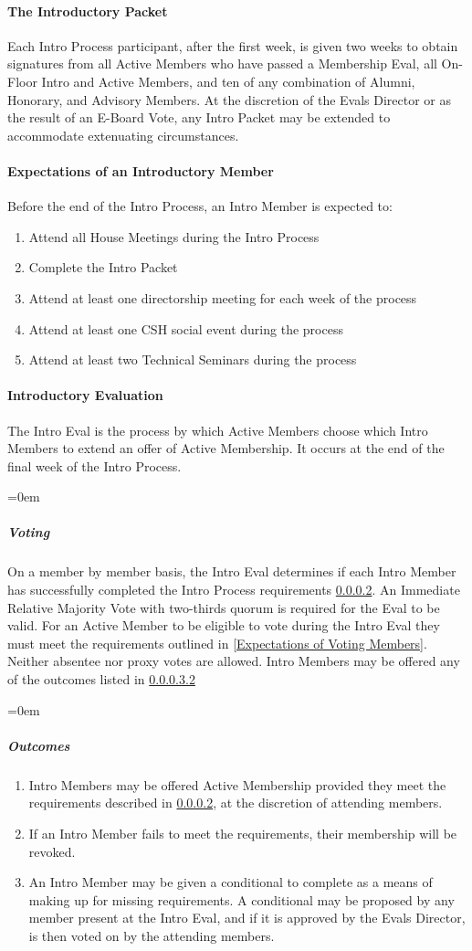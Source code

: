 \documentclass{article}
\newcommand{\asubsubsection}[1]{\paragraph{#1} \label{#1}}
\newcommand{\asubsubsubsection}[1]{\parindent=0em\subparagraph{#1} \label{#1}}
\begin{document}
\asubsubsection{The Introductory Packet}
Each Intro Process participant, after the first week, is given two weeks to obtain signatures from all Active Members who have passed a Membership Eval, all On-Floor Intro and Active Members, and ten of any combination of Alumni, Honorary, and Advisory Members.
At the discretion of the Evals Director or as the result of an E-Board Vote, any Intro Packet may be extended to accommodate extenuating circumstances.

\asubsubsection{Expectations of an Introductory Member}
\renewcommand{\theenumi}{\arabic{enumi}} %
Before the end of the Intro Process, an Intro Member is expected to:
\begin{enumerate}
	\item Attend all House Meetings during the Intro Process
	\item Complete the Intro Packet
	\item Attend at least one directorship meeting for each week of the process
	\item Attend at least one CSH social event during the process
	\item Attend at least two Technical Seminars during the process
\end{enumerate}

\asubsubsection{Introductory Evaluation}
The Intro Eval is the process by which Active Members choose which Intro Members to extend an offer of Active Membership.
It occurs at the end of the final week of the Intro Process.

\asubsubsubsection{Voting}
On a member by member basis, the Intro Eval determines if each Intro Member has successfully completed the Intro Process requirements \ref{Expectations of an Introductory Member}.
An Immediate Relative Majority Vote with two-thirds quorum is required for the Eval to be valid.
For an Active Member to be eligible to vote during the Intro Eval they must meet the requirements outlined in \ref{Expectations of Voting Members}.
Neither absentee nor proxy votes are allowed.
Intro Members may be offered any of the outcomes listed in \ref{Outcomes}

\asubsubsubsection{Outcomes}
\renewcommand{\theenumi}{\alph{enumi}} %
\begin{enumerate}
	\item Intro Members may be offered Active Membership provided they meet the requirements described in \ref{Expectations of an Introductory Member}, at the discretion of attending members.
	\item If an Intro Member fails to meet the requirements, their membership will be revoked.
	\item An Intro Member may be given a conditional to complete as a means of making up for missing requirements.
	      A conditional may be proposed by any member present at the Intro Eval, and if it is approved by the Evals Director, is then voted on by the attending members.
\end{enumerate}
\end{document}
